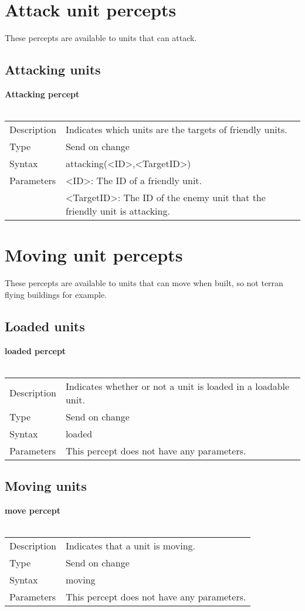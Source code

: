 \documentclass[english,11pt]{report}
\begin{document}
\newpage
\section{Attack unit percepts}
These percepts are available to units that can attack.

\subsection{Attacking units}
\textbf{Attacking percept}\\
\\
\begin{tabularx}{\textwidth}{lX}
 Description & Indicates which units are the targets of friendly units. \\
 Type & Send on change \\
 Syntax & attacking(<ID>,<TargetID>) \\
 Parameters &   <ID>: The ID of a friendly unit.\\
            &   <TargetID>: The ID of the enemy unit that the friendly unit is attacking.
\end{tabularx}

\newpage
\section{Moving unit percepts}
These percepts are available to units that can move when built, so not terran flying buildings for example.

\subsection{Loaded units}
\textbf{loaded percept}\\
\\
\begin{tabularx}{\textwidth}{lX}
 Description & Indicates whether or not a unit is loaded in a loadable unit. \\
 Type & Send on change \\
 Syntax & loaded \\
 Parameters &   This percept does not have any parameters.
\end{tabularx}

\subsection{Moving units}
\textbf{move percept}\\
\\
\begin{tabularx}{\textwidth}{lX}
 Description & Indicates that a unit is moving. \\
 Type & Send on change \\
 Syntax & moving \\
 Parameters &   This percept does not have any parameters.
\end{tabularx}
\end{document}
